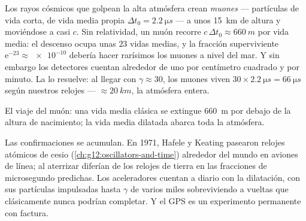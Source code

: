 \begin{example}\label{ex:g12:special-relativity:muons}
Los rayos cósmicos que golpean la alta atmósfera crean \emph{muones} --- partículas de
vida corta, de vida media propia $\Delta t_0 = \qty{2.2}{\micro s}$ --- a unos
\qty{15}{km} de altura y moviéndose a casi $c$. Sin relatividad, un muón recorre
$c\,\Delta t_0 \approx \qty{660}{m}$ por vida media: el descenso ocupa unas $23$ vidas
medias, y la fracción superviviente $\mathrm{e}^{-23} \approx \num{e-10}$ debería
hacer rarísimos los muones a nivel del mar. Y sin embargo los detectores cuentan
alrededor de uno por centímetro cuadrado y por minuto. La  lo
resuelve: al llegar con $\gamma \approx 30$, los muones viven
$30 \times \qty{2.2}{\micro s} = \qty{66}{\micro s}$ según nuestros relojes ---
 $\approx \qty{20}{km}$, la atmósfera entera.
\end{example}

\begin{omfigure}

{\small El viaje del muón: una vida media clásica se extingue \qty{660}{m} por debajo
de la altura de nacimiento; la vida media dilatada abarca toda la atmósfera.}
\end{omfigure}

Las confirmaciones se acumulan. En 1971, Hafele y Keating pasearon relojes atómicos de
cesio (\cref{ch:g12:oscillators-and-time}) alrededor del mundo en aviones de línea; al
aterrizar diferían de los relojes de tierra en las fracciones de microsegundo
predichas. Los aceleradores cuentan a diario con la dilatación, con sus partículas
impulsadas hasta $\gamma$ de varios miles sobreviviendo a vueltas que clásicamente
nunca podrían completar. Y el GPS es un experimento permanente con factura.

